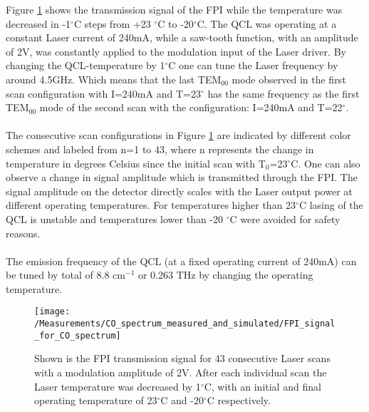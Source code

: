 \noindent
Figure \ref{fig:FPI_signal_for_CO_spectrum} shows the transmission signal of the FPI while the temperature was decreased in -1$^{\circ}$C steps from +23 $^{\circ}$C to -20$^{\circ}$C. The QCL was operating at a constant Laser current of 240mA, while a saw-tooth function, with an amplitude of 2V, was constantly applied to the modulation input of the Laser driver. By changing the QCL-temperature by 1$^{\circ}$C one can tune the Laser frequency by around 4.5GHz. Which means that the last TEM$_{00}$ mode observed in the first scan configuration with I=240mA and T=23$^{\circ}$ has the same frequency as the first TEM$_{00}$ mode of the second scan with the configuration: I=240mA and T=22$^{\circ}$. \\\\
\noindent
The consecutive scan configurations in Figure \ref{fig:FPI_signal_for_CO_spectrum} are indicated by different color schemes and labeled from n=1 to 43, where n represents the change in temperature in degrees Celsius since the initial scan with T$_0$=23$^{\circ}$C. One can also observe a change in signal amplitude which is transmitted through the FPI. The signal amplitude on the detector directly scales with the Laser output power at different operating temperatures. For temperatures higher than 23$^{\circ}$C lasing of the QCL is unstable and temperatures lower than -20 $^{\circ}$C were avoided for safety reasons.\\\\
\noindent
The emission frequency of the QCL (at a fixed operating current of 240mA) can be tuned by total of 8.8 cm$^{-1}$ or 0.263 THz by changing the operating temperature. 
\begin{figure}[H]
	\centering
	\texttt{[image: /Measurements/CO\_spectrum\_measured\_and\_simulated/FPI\_signal\_for\_CO\_spectrum]}
	\caption{Shown is the FPI transmission signal for 43 consecutive Laser scans with a modulation amplitude of 2V. After each individual scan the Laser temperature was decreased by 1$^{\circ}$C, with an initial and final operating temperature of 23$^{\circ}$C and -20$^{\circ}$C respectively. }
	\label{fig:FPI_signal_for_CO_spectrum}
\end{figure}
